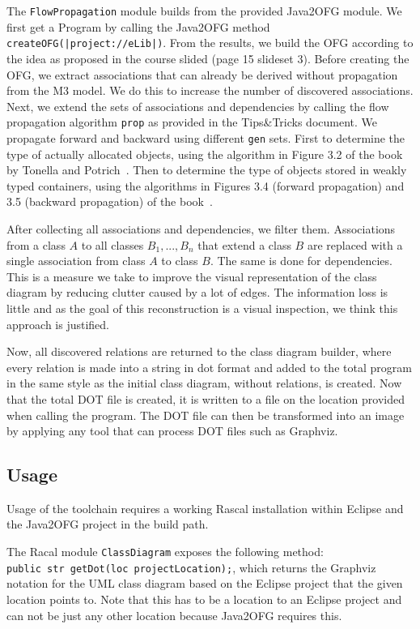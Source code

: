 \indent The \texttt{FlowPropagation} module builds from the provided Java2OFG module. 
We first get a Program by calling the Java2OFG method \texttt{createOFG(|project://eLib|)}. 
From the results, we build the OFG according to the idea as proposed in the course slided (page 15 slideset 3). 
Before creating the OFG, we extract associations that can already be derived without propagation from the M3 model. 
We do this to increase the number of discovered associations.  
Next, we extend the sets of associations and dependencies by calling the flow propagation algorithm \texttt{prop} 
as provided in the Tips\&Tricks document. 
We propagate forward and backward using different \texttt{gen} sets. 
First to determine the type of actually allocated objects, using the algorithm in Figure 3.2 of the book by Tonella and Potrich~\cite{rev-eng}.
Then to determine the type of objects stored in weakly typed containers, 
using the algorithms in Figures 3.4 (forward propagation) and 3.5 (backward propagation) of the book~\cite{rev-eng}.

After collecting all associations and dependencies, we filter them. 
Associations from a class $A$ to all classes $B_1, ... , B_n$ that extend a class $B$ 
are replaced with a single association from class $A$ to class $B$. The same is done for dependencies. 
This is a measure we take to improve the visual representation of the class diagram by reducing clutter caused by a lot of edges. 
The information loss is little and as the goal of this reconstruction is a visual inspection, we think this approach is justified.

Now, all discovered relations are returned to the class diagram builder, where every relation is made into a string in dot format and added to the total program in the same style as the initial class diagram, without relations, is created. Now that the total DOT file is created, it is written to a file on the location provided when calling the program. The DOT file can then be transformed into an image by applying any tool that can process DOT files such as Graphviz.

\subsection{Usage}\label{usage}
	Usage of the toolchain requires a working Rascal installation within Eclipse and the Java2OFG project in the build path.

	The Racal module \texttt{ClassDiagram} exposes the following method:\\ \texttt{public str getDot(loc projectLocation);}, which returns the Graphviz notation for the UML class diagram based on the Eclipse project that the given location points to.
	Note that this has to be a location to an Eclipse project and can not be just any other location because Java2OFG requires this.

